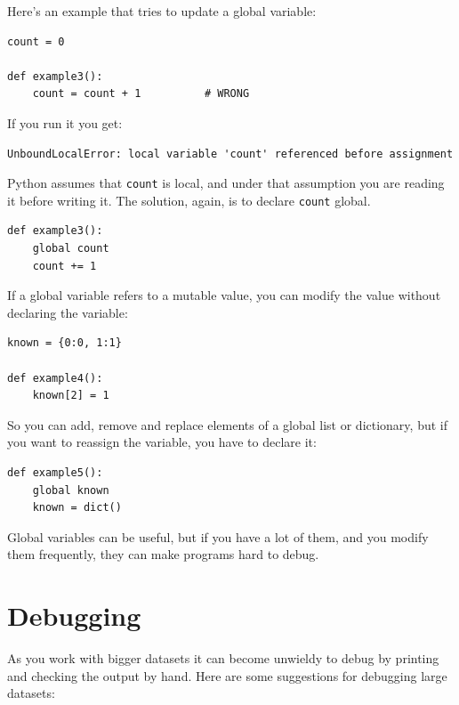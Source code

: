 \documentclass[10pt]{book}
\begin{document}
Here's an example that tries to update a global variable:

\begin{verbatim}
count = 0

def example3():
    count = count + 1          # WRONG
\end{verbatim}
%
If you run it you get:

\begin{verbatim}
UnboundLocalError: local variable 'count' referenced before assignment
\end{verbatim}
%
Python assumes that {\tt count} is local, and under that assumption
you are reading it before writing it.  The solution, again,
is to declare {\tt count} global.

\begin{verbatim}
def example3():
    global count
    count += 1
\end{verbatim}
%
If a global variable refers to a mutable value, you can modify
the value without declaring the variable:

\begin{verbatim}
known = {0:0, 1:1}

def example4():
    known[2] = 1
\end{verbatim}
%
So you can add, remove and replace elements of a global list or
dictionary, but if you want to reassign the variable, you
have to declare it:

\begin{verbatim}
def example5():
    global known
    known = dict()
\end{verbatim}
%
Global variables can be useful, but if you have a lot of them,
and you modify them frequently, they can make programs
hard to debug.


\section{Debugging}

As you work with bigger datasets it can become unwieldy to
debug by printing and checking the output by hand.  Here are some
suggestions for debugging large datasets:
\end{document}
